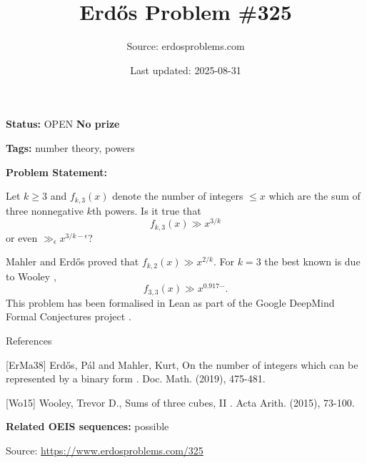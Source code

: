 \documentclass{article}
\title{Erd\H{o}s Problem \#325}
\date{Last updated: 2025-08-31}
\author{Source: erdosproblems.com}
\begin{document}
\maketitle

\noindent\textbf{Status:} OPEN \quad \textbf{No prize}

\noindent\textbf{Tags:} number theory, powers

\medskip

\noindent\textbf{Problem Statement:}

Let $k\geq 3$ and $f_{k,3}(x)$ denote the number of integers $\leq x$ which are the sum of three nonnegative $k$th powers. Is it true that\[f_{k,3}(x) \gg x^{3/k}\]or even $\gg_\epsilon x^{3/k-\epsilon}$?




Mahler and Erd\H{o}s \cite{ErMa38} proved that $f_{k,2}(x) \gg x^{2/k}$. For $k=3$ the best known is due to Wooley \cite{Wo15},\[f_{3,3}(x) \gg x^{0.917\cdots}.\]This problem has been formalised in Lean as part of the Google DeepMind Formal Conjectures project .




References

[ErMa38] Erd\H{o}s, P\'{a}l and Mahler, Kurt, On the number of integers which can be represented by a binary form . Doc. Math. (2019), 475-481.

[Wo15] Wooley, Trevor D., Sums of three cubes, II . Acta Arith. (2015), 73-100.

\noindent\textbf{Related OEIS sequences:} possible


\bigskip
\noindent\small{Source: \url{https://www.erdosproblems.com/325}}
\end{document}
